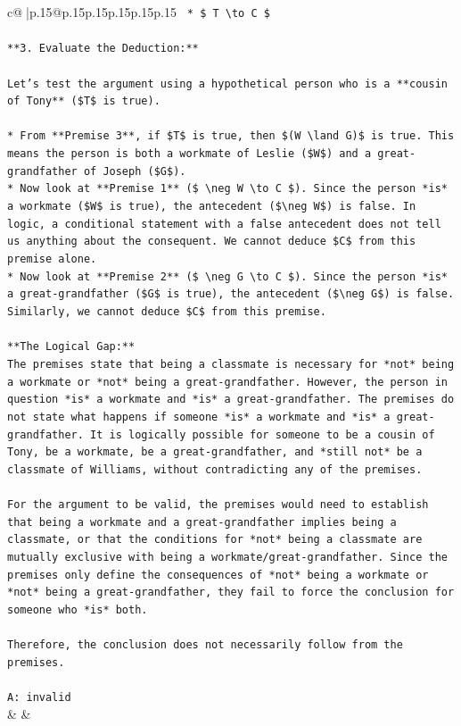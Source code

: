\documentclass{article}
\begin{document}
{\begin{supertabular}{c@{$\;$}|p{.15\linewidth}@{}p{.15\linewidth}p{.15\linewidth}p{.15\linewidth}p{.15\linewidth}p{.15\linewidth}}
{{{\texttt{    *   \$ T \textbackslash{}to C \$} \\
\\ 
\texttt{**3. Evaluate the Deduction:**} \\
\\ 
\texttt{Let's test the argument using a hypothetical person who is a **cousin of Tony** (\$T\$ is true).} \\
\\ 
\texttt{*   From **Premise 3**, if \$T\$ is true, then \$(W \textbackslash{}land G)\$ is true. This means the person is both a workmate of Leslie (\$W\$) and a great{-}grandfather of Joseph (\$G\$).} \\
\texttt{*   Now look at **Premise 1** (\$ \textbackslash{}neg W \textbackslash{}to C \$). Since the person *is* a workmate (\$W\$ is true), the antecedent (\$\textbackslash{}neg W\$) is false. In logic, a conditional statement with a false antecedent does not tell us anything about the consequent. We cannot deduce \$C\$ from this premise alone.} \\
\texttt{*   Now look at **Premise 2** (\$ \textbackslash{}neg G \textbackslash{}to C \$). Since the person *is* a great{-}grandfather (\$G\$ is true), the antecedent (\$\textbackslash{}neg G\$) is false. Similarly, we cannot deduce \$C\$ from this premise.} \\
\\ 
\texttt{**The Logical Gap:**} \\
\texttt{The premises state that being a classmate is necessary for *not* being a workmate or *not* being a great{-}grandfather. However, the person in question *is* a workmate and *is* a great{-}grandfather. The premises do not state what happens if someone *is* a workmate and *is* a great{-}grandfather. It is logically possible for someone to be a cousin of Tony, be a workmate, be a great{-}grandfather, and *still not* be a classmate of Williams, without contradicting any of the premises.} \\
\\ 
\texttt{For the argument to be valid, the premises would need to establish that being a workmate and a great{-}grandfather implies being a classmate, or that the conditions for *not* being a classmate are mutually exclusive with being a workmate/great{-}grandfather. Since the premises only define the consequences of *not* being a workmate or *not* being a great{-}grandfather, they fail to force the conclusion for someone who *is* both.} \\
\\ 
\texttt{Therefore, the conclusion does not necessarily follow from the premises.} \\
\\ 
\texttt{A: invalid} \\
            }
        }
    }
    & & \\ \\


\end{supertabular}}
\end{document}
